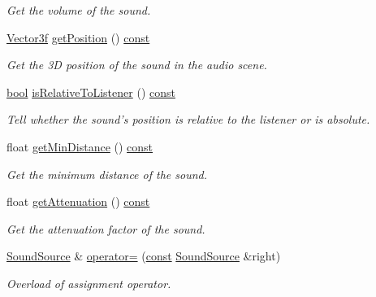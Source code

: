 \begin{DoxyCompactItemize}
\begin{DoxyCompactList}\small\item\em Get the volume of the sound. \end{DoxyCompactList}\item 
\hyperlink{namespacesf_a36e44d9e6d8f649703698ec9d24ac052}{Vector3f} \hyperlink{classsf_1_1_sound_source_a4c3bc60286f488aaf2941ab76476eebc}{get\-Position} () \hyperlink{term__entry_8h_a57bd63ce7f9a353488880e3de6692d5a}{const} 
\begin{DoxyCompactList}\small\item\em Get the 3\-D position of the sound in the audio scene. \end{DoxyCompactList}\item 
\hyperlink{term__entry_8h_a002004ba5d663f149f6c38064926abac}{bool} \hyperlink{classsf_1_1_sound_source_a5cb9107e1c47f65ab82c4885436061ef}{is\-Relative\-To\-Listener} () \hyperlink{term__entry_8h_a57bd63ce7f9a353488880e3de6692d5a}{const} 
\begin{DoxyCompactList}\small\item\em Tell whether the sound's position is relative to the listener or is absolute. \end{DoxyCompactList}\item 
float \hyperlink{classsf_1_1_sound_source_a3379b9f7a0f0e31ab9a4e5fa1762986e}{get\-Min\-Distance} () \hyperlink{term__entry_8h_a57bd63ce7f9a353488880e3de6692d5a}{const} 
\begin{DoxyCompactList}\small\item\em Get the minimum distance of the sound. \end{DoxyCompactList}\item 
float \hyperlink{classsf_1_1_sound_source_ac5f5ffef8930bb573f43d47cbc779bf6}{get\-Attenuation} () \hyperlink{term__entry_8h_a57bd63ce7f9a353488880e3de6692d5a}{const} 
\begin{DoxyCompactList}\small\item\em Get the attenuation factor of the sound. \end{DoxyCompactList}\item 
\hyperlink{classsf_1_1_sound_source}{Sound\-Source} \& \hyperlink{classsf_1_1_sound_source_a355a07f34b5ecc38465d39a33b701b6d}{operator=} (\hyperlink{term__entry_8h_a57bd63ce7f9a353488880e3de6692d5a}{const} \hyperlink{classsf_1_1_sound_source}{Sound\-Source} \&right)
\begin{DoxyCompactList}\small\item\em Overload of assignment operator. \end{DoxyCompactList}\end{DoxyCompactItemize}
